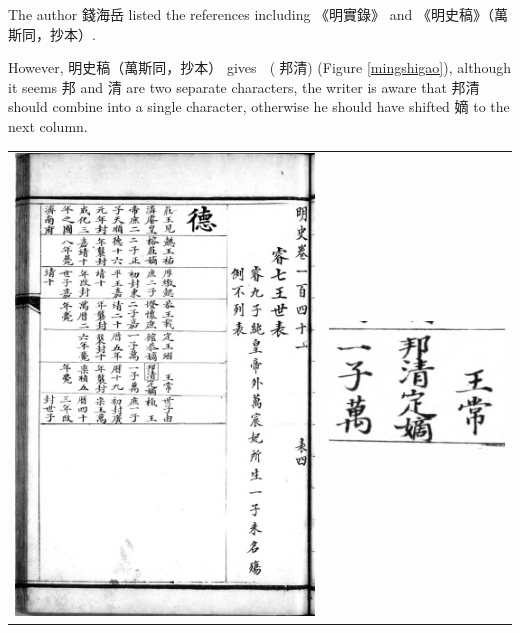 \documentclass{article}
\begin{document}
The author 錢海岳 listed the references \cite[p. 5517]{南明史} including 《明實錄》 and 《明史稿》（萬斯同，抄本）.

\newpage

However, 明史稿（萬斯同，抄本）\cite{明史稿萬斯同} gives {\huge 﫠} (⿱邦清) (Figure \ref{mingshigao}), although it seems 邦 and 清 are two separate characters, the writer is aware that 邦清 should combine into a single character, otherwise he should have shifted 嫡 to the next column.

\begin{center}
    \begin{tabular}{ c c }
        \includegraphics[height=.89\textheight]{95-0.jpg} & \includegraphics[width=.3\textwidth]{95-0-crop.png}
    \end{tabular}
    \label{mingshigao}
\end{center}
\end{document}
